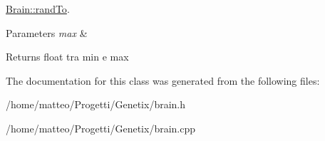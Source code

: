 \hyperlink{classBrain_acb60a16fa86243d358bb64bfaeee91d0}{Brain\+::rand\+To}. 


\begin{DoxyParams}{Parameters}
{\em max} & \\
\hline
\end{DoxyParams}
\begin{DoxyReturn}{Returns}
float tra min e max 
\end{DoxyReturn}


The documentation for this class was generated from the following files\+:\begin{DoxyCompactItemize}
\item 
/home/matteo/\+Progetti/\+Genetix/brain.\+h\item 
/home/matteo/\+Progetti/\+Genetix/brain.\+cpp\end{DoxyCompactItemize}
